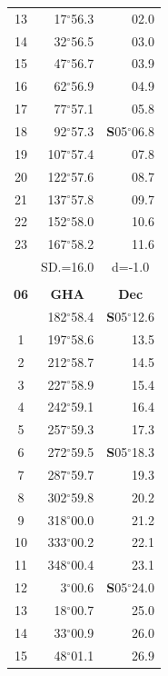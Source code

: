 \documentclass[10pt, a4paper]{report}
\begin{document}
\begin{scriptsize}
\begin{tabular*}{0.2\textwidth}[t]{@{\extracolsep{\fill}}|c|rr|}
13 & 17$^\circ$56.3 & 02.0\\
14 & 32$^\circ$56.5 & 03.0\\
15 & 47$^\circ$56.7 & \raisebox{0.24ex}{\boldmath$\cdot$~\boldmath$\cdot$~~}03.9\\
16 & 62$^\circ$56.9 & 04.9\\
17 & 77$^\circ$57.1 & 05.8\\[2Pt]
18 & 92$^\circ$57.3 & \textbf{S}05$^\circ$06.8\\
19 & 107$^\circ$57.4 & 07.8\\
20 & 122$^\circ$57.6 & 08.7\\
21 & 137$^\circ$57.8 & \raisebox{0.24ex}{\boldmath$\cdot$~\boldmath$\cdot$~~}09.7\\
22 & 152$^\circ$58.0 & 10.6\\
23 & 167$^\circ$58.2 & 11.6\\
\hline
\rule{0pt}{2.4ex} & \multicolumn{1}{c}{SD.=16.0} & \multicolumn{1}{c|}{d=-1.0}\\
\hline
\multicolumn{1}{c}{}\\[-0.5ex]\hline
\multicolumn{1}{|c|}{\rule{0pt}{2.6ex}\textbf{06}} & \multicolumn{1}{c}{\textbf{GHA}} & \multicolumn{1}{c|}{\textbf{Dec}}\\
\hline\rule{0pt}{2.6ex}\noindent
0 & 182$^\circ$58.4 & \textbf{S}05$^\circ$12.6\\
1 & 197$^\circ$58.6 & 13.5\\
2 & 212$^\circ$58.7 & 14.5\\
3 & 227$^\circ$58.9 & \raisebox{0.24ex}{\boldmath$\cdot$~\boldmath$\cdot$~~}15.4\\
4 & 242$^\circ$59.1 & 16.4\\
5 & 257$^\circ$59.3 & 17.3\\[2Pt]
6 & 272$^\circ$59.5 & \textbf{S}05$^\circ$18.3\\
7 & 287$^\circ$59.7 & 19.3\\
8 & 302$^\circ$59.8 & 20.2\\
9 & 318$^\circ$00.0 & \raisebox{0.24ex}{\boldmath$\cdot$~\boldmath$\cdot$~~}21.2\\
10 & 333$^\circ$00.2 & 22.1\\
11 & 348$^\circ$00.4 & 23.1\\[2Pt]
12 & 3$^\circ$00.6 & \textbf{S}05$^\circ$24.0\\
13 & 18$^\circ$00.7 & 25.0\\
14 & 33$^\circ$00.9 & 26.0\\
15 & 48$^\circ$01.1 & \raisebox{0.24ex}{\boldmath$\cdot$~\boldmath$\cdot$~~}26.9\\

\end{tabular*}
\end{scriptsize}
\end{document}
